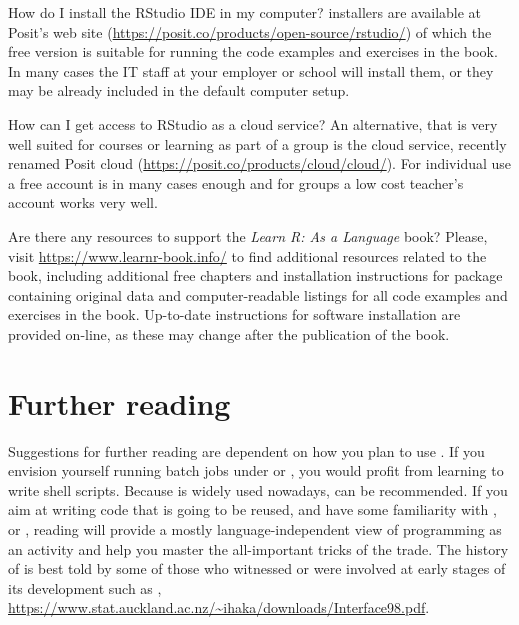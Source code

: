 \documentclass[krantz2]{krantz}\usepackage{knitr}
\begin{document}
\begin{faqbox}{How do I install the \textsf{RStudio} IDE in my computer?}
\RStudio installers are available at Posit's web site (\url{https://posit.co/products/open-source/rstudio/}) of which the free version is suitable for running the code examples and exercises in the book. In many cases the IT staff at your employer or school will install them, or they may be already included in the default computer setup.
\end{faqbox}

\begin{faqbox}{How can I get access to \textsf{RStudio} as a cloud service?}
An alternative, that is very well suited for courses or learning as part of a group is the \RStudio cloud service, recently renamed Posit cloud (\url{https://posit.co/products/cloud/cloud/}). For individual use a free account is in many cases enough and for groups a low cost teacher's account works very well.
\end{faqbox}

\begin{faqbox}{Are there any resources to support the \emph{Learn R: As a Language} book?}
Please, visit \url{https://www.learnr-book.info/} to find additional resources related to the book, including additional free chapters and installation instructions for package  containing original data and computer-readable listings for all code examples and exercises in the book. Up-to-date instructions for software installation are provided on-line, as these may change after the publication of the book.
\end{faqbox}

\section{Further reading}
Suggestions for further reading are dependent on how you plan to use \Rlang. If you envision yourself running batch jobs under  or , you would profit from learning to write shell scripts. Because  is widely used nowadays,  \autocite{Newham2005} can be recommended. If you aim at writing \Rlang code that is going to be reused, and have some familiarity with \Clang, \Cpplang or \javalang, reading  \autocite{Kernighan1999} will provide a mostly language-independent view of programming as an activity and help you master the all-important tricks of the trade. The history of \Rlang is best told by some of those who witnessed or were involved at early stages of its development such as \autocite{Chambers2016}, \autocite{Ihaka1998} \url{https://www.stat.auckland.ac.nz/~ihaka/downloads/Interface98.pdf}.
\end{document}
